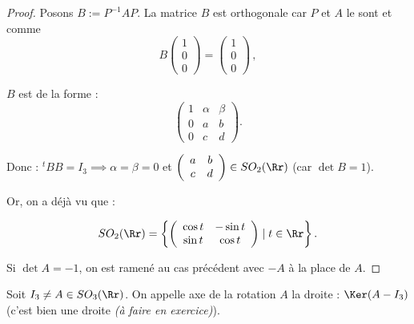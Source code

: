 \documentclass[class=report,crop=false]{standalone}
\newcommand{\exoo}{\emph{(à faire en exercice)}}
\begin{document}
\begin{proof}
Posons $B:=P^{-1} AP$. La matrice $B$ est orthogonale car $P$ et $A$ le sont et comme \[B\left(\begin{array}{c}
1\\
0\\
0
\end{array}\right) = \left(\begin{array}{c}
1\\
0\\
0
\end{array}\right) \,,\]

$B$ est de la forme :
\[\left(\begin{array}{ccc}
1 & \alpha & \beta\\
0 & a &b\\
0& c & d
\end{array}\right) .\]

Donc : ${}^t\!BB = I_3 \implies \alpha =\beta = 0$ et $\left(\begin{array}{cc}
a & b\\
c&d
\end{array}\right) \in SO_2(\Rr)$ (car $\det B=1$).
 
Or, on a déjà vu que :

\[SO_2(\Rr) = \left\lbrace {\left(
\begin{array}{cc}
\cos t & -\sin t \\ 
\sin t & \cos t
                         \end{array}
                         \right) \mid t \in \Rr} \right\rbrace  .\]




Si $\det A=-1$, on est ramené au cas précédent avec $-A$ à la place de $A$.
\end{proof}

\begin{definition}
Soit $I_3 \neq A \in SO_3(\Rr)$. On appelle axe de la rotation  $A$ la droite : $\Ker (A -I_3)$ (c'est bien une droite \exoo ).
\end{definition}
\end{document}
